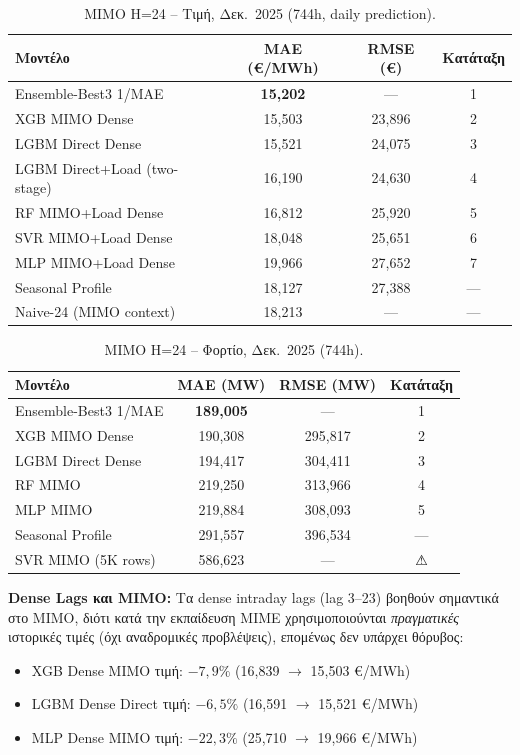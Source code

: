 \begin{table}[H]
\centering
\caption{MIMO H=24 -- Τιμή, Δεκ.\ 2025 (744h, daily prediction).}
\label{tab:mimo_price_1m}
\begin{tabular}{lccc}
\toprule
\textbf{Μοντέλο} & \textbf{MAE (€/MWh)} & \textbf{RMSE (€)} & \textbf{Κατάταξη} \\
\midrule
Ensemble-Best3 1/MAE & \textbf{15,202} & --- & 1 \\
XGB MIMO Dense & 15,503 & 23,896 & 2 \\
LGBM Direct Dense & 15,521 & 24,075 & 3 \\
LGBM Direct+Load (two-stage) & 16,190 & 24,630 & 4 \\
RF MIMO+Load Dense & 16,812 & 25,920 & 5 \\
SVR MIMO+Load Dense & 18,048 & 25,651 & 6 \\
MLP MIMO+Load Dense & 19,966 & 27,652 & 7 \\
\midrule
Seasonal Profile & 18,127 & 27,388 & --- \\
Naive-24 (MIMO context) & 18,213 & --- & --- \\
\bottomrule
\end{tabular}
\end{table}

\begin{table}[H]
\centering
\caption{MIMO H=24 -- Φορτίο, Δεκ.\ 2025 (744h).}
\label{tab:mimo_load_1m}
\begin{tabular}{lccc}
\toprule
\textbf{Μοντέλο} & \textbf{MAE (MW)} & \textbf{RMSE (MW)} & \textbf{Κατάταξη} \\
\midrule
Ensemble-Best3 1/MAE & \textbf{189,005} & --- & 1 \\
XGB MIMO Dense & 190,308 & 295,817 & 2 \\
LGBM Direct Dense & 194,417 & 304,411 & 3 \\
RF MIMO & 219,250 & 313,966 & 4 \\
MLP MIMO & 219,884 & 308,093 & 5 \\
\midrule
Seasonal Profile & 291,557 & 396,534 & --- \\
SVR MIMO (5K rows) & 586,623 & --- & ⚠ \\
\bottomrule
\end{tabular}
\end{table}

\noindent\textbf{Dense Lags και MIMO:} Τα dense intraday lags (lag 3--23) βοηθούν σημαντικά στο
MIMO, διότι κατά την εκπαίδευση MIME χρησιμοποιούνται \textit{πραγματικές} ιστορικές τιμές (όχι
αναδρομικές προβλέψεις), επομένως δεν υπάρχει θόρυβος:
\begin{itemize}
    \item XGB Dense MIMO τιμή: $-7,9\%$ (16,839 $\to$ 15,503 €/MWh)
    \item LGBM Dense Direct τιμή: $-6,5\%$ (16,591 $\to$ 15,521 €/MWh)
    \item MLP Dense MIMO τιμή: $-22,3\%$ (25,710 $\to$ 19,966 €/MWh)
\end{itemize}

